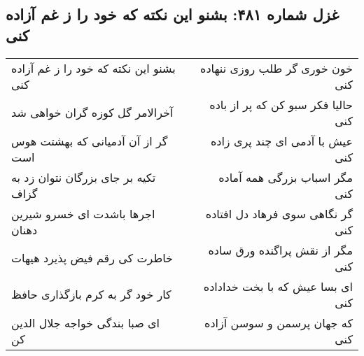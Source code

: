 \begin{center}
\section*{غزل شماره ۴۸۱: بشنو این نکته که خود را ز غم آزاده کنی}
\label{sec:sh481}
\begin{longtable}{l p{0.5cm} r}
بشنو این نکته که خود را ز غم آزاده کنی
&&
خون خوری گر طلب روزی ننهاده کنی
\\
آخرالامر گل کوزه گران خواهی شد
&&
حالیا فکر سبو کن که پر از باده کنی
\\
گر از آن آدمیانی که بهشتت هوس است
&&
عیش با آدمی ای چند پری زاده کنی
\\
تکیه بر جای بزرگان نتوان زد به گزاف
&&
مگر اسباب بزرگی همه آماده کنی
\\
اجرها باشدت ای خسرو شیرین دهنان
&&
گر نگاهی سوی فرهاد دل افتاده کنی
\\
خاطرت کی رقم فیض پذیرد هیهات
&&
مگر از نقش پراگنده ورق ساده کنی
\\
کار خود گر به کرم بازگذاری حافظ
&&
ای بسا عیش که با بخت خداداده کنی
\\
ای صبا بندگی خواجه جلال الدین کن
&&
که جهان پرسمن و سوسن آزاده کنی
\\
\end{longtable}
\end{center}
